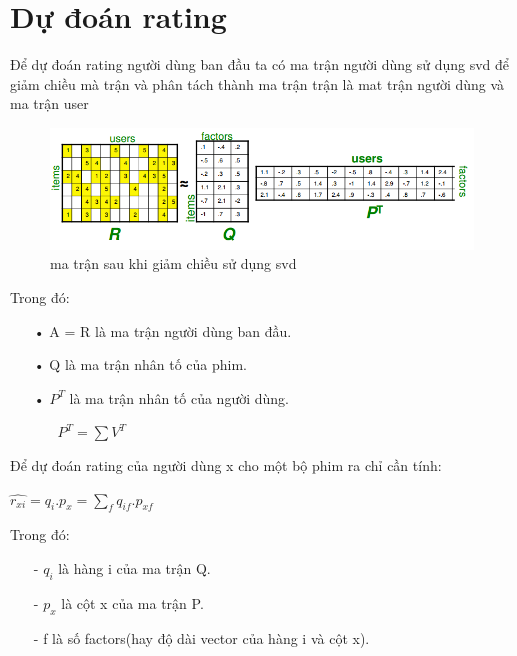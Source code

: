 \documentclass[a4paper,10pt]{report}
\begin{document}
\section{Dự đoán rating}
Để dự đoán rating người dùng ban đầu ta có ma trận người dùng sử dụng svd để giảm chiều mà trận và phân tách thành ma trận trận là mat trận người dùng và ma trận user
\begin{figure}
\begin{center}
\includegraphics[scale=0.8]{svd1.png}
\caption{ma trận sau khi giảm chiều sử dụng svd}
\end{center}
\end{figure}
\newpage
Trong đó:
\begin{itemize}
\item[•] A = R là ma trận người dùng ban đầu.
\item[•] Q là ma trận nhân tố của phim.
\item[•] $P^T$ là ma trận nhân tố của người dùng.
\begin{itemize}
\item[] $P^T = \sum V^T$
\end{itemize}
\end{itemize}
Để dự đoán rating của người dùng x cho một bộ phim ra chỉ cần tính:
\begin{center}
$\hat{r_{xi}} = q_i.p_x = \sum_fq_{if}.p_{xf}$
\end{center}
Trong đó:
\begin{itemize}
\item[-] $q_i$ là hàng i của ma trận Q.
\item[-] $p_x$ là cột x của ma trận P.
\item[-] f là số factors(hay độ dài vector của hàng i và cột x).
\end{itemize}
\end{document}
